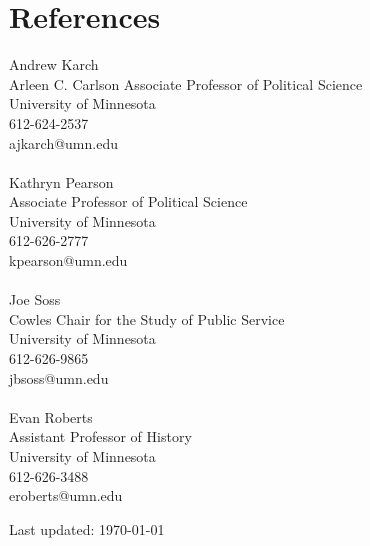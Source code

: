 \documentclass[12pt, letter]{article}
\begin{document}
\section*{References}
\begin{multicols}{2}
	Andrew Karch \\
	Arleen C. Carlson Associate Professor of Political Science \\
	University of Minnesota \\
	612-624-2537 \\
	ajkarch@umn.edu \\
	\\
	Kathryn Pearson \\
	Associate Professor of Political Science \\
	University of Minnesota \\
	612-626-2777 \\
	kpearson@umn.edu\\
	\\
	Joe Soss \\
	Cowles Chair for the Study of Public Service \\
	University of Minnesota \\
	612-626-9865 \\
	jbsoss@umn.edu \\
	\\
	Evan Roberts \\
	Assistant Professor of History \\
	University of Minnesota \\
	612-626-3488 \\
	eroberts@umn.edu
\end{multicols}
\begin{center}
\scriptsize{Last updated: \today}

\end{center}
\end{document}
